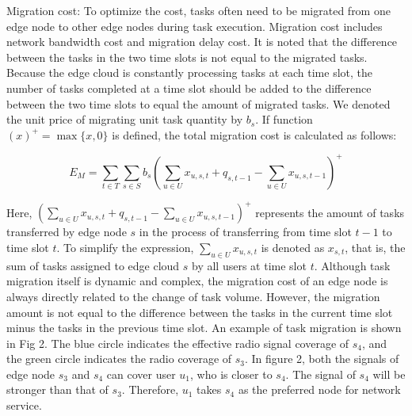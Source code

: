 \documentclass[journal,article,submit,pdftex,moreauthors]{Definitions/mdpi}
\begin{document}
Migration cost: To optimize the cost, tasks often need to be migrated from one edge node to other edge nodes during task execution. Migration cost includes network bandwidth cost and migration delay cost. It is noted that the difference between the tasks in the two time slots is not equal to the migrated tasks. Because the edge cloud is constantly processing tasks at each time slot, the number of tasks completed at a time slot should be added to the difference between the two time slots to equal the amount of migrated tasks. We denoted the unit price of migrating unit task quantity by $b_s$. If function $(x)^{+}=\max\{x,0\}$ is defined, the total migration cost is calculated as follows:

\begin{equation}
E_M=\sum_{t\in T}\sum_{s\in S}b_s(\sum_{u\in U}x_{u,s,t}+q_{s,t-1}-\sum_{u\in U}x_{u,s,t-1})^{+}    
\end{equation}


Here, $(\sum_{u\in U}x_{u,s,t}+q_{s,t-1}-\sum_{u\in U}x_{u,s,t-1})^{+}$ represents the amount of tasks transferred by edge node $s$ in the process of transferring from time slot $t-1$ to time slot $t$. To simplify the expression, $\sum_{u\in U}x_{u,s,t}$ is denoted as $x_{s,t}$, that is, the sum of tasks assigned to edge cloud $s$ by all users at time slot $t$. Although task migration itself is dynamic and complex, the migration cost of an edge node is always directly related to the change of task volume. However, the migration amount is not equal to the difference between the tasks in the current time slot minus the tasks in the previous time slot. An example of task migration is shown in Fig 2. The blue circle indicates the effective radio signal coverage of $s_4$, and the green circle indicates the radio coverage of $s_3$. In  figure 2, both the signals of edge node $s_3$ and $s_4$ can cover user $u_1$, who is closer to $s_4$. The signal of $s_4$ will be stronger than that of $s_3$. Therefore, $u_1$ takes $s_4$ as the preferred node for network service. 
\end{document}

